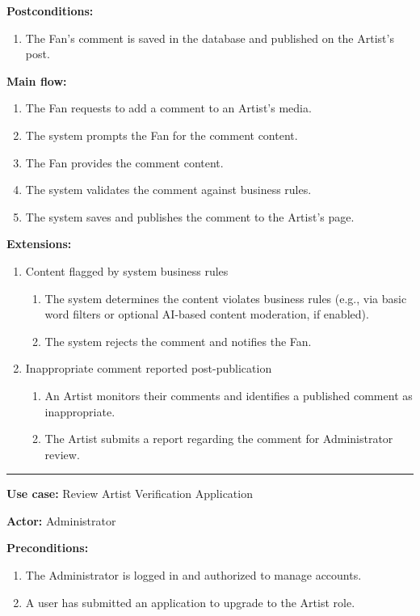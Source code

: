 \documentclass{article}
\begin{document}
{\bfseries Postconditions:}
\begin{enumerate}
	\item The Fan's comment is saved in the database and published on the Artist's post.
\end{enumerate}

{\bfseries Main flow:}
\begin{enumerate}
	\item The Fan requests to add a comment to an Artist's media.
	\item The system prompts the Fan for the comment content.
	\item The Fan provides the comment content.
	\item The system validates the comment against business rules.
	\item The system saves and publishes the comment to the Artist's page.
\end{enumerate}

{\bfseries Extensions:}
\begin{enumerate}
	\item [4a.] Content flagged by system business rules
	\begin{enumerate}
		\item [4a1.] The system determines the content violates business rules (e.g., via basic word filters or optional AI-based content moderation, if enabled).
		\item [4a2.] The system rejects the comment and notifies the Fan.
	\end{enumerate}
	\item [5a.] Inappropriate comment reported post-publication
	\begin{enumerate}
		\item [5a1.] An Artist monitors their comments and identifies a published comment as inappropriate.
		\item [5a2.] The Artist submits a report regarding the comment for Administrator review.
	\end{enumerate}
\end{enumerate}


\hrule
\bigskip

{\bfseries Use case:} Review Artist Verification Application

{\bfseries Actor:} Administrator

{\bfseries Preconditions:}
\begin{enumerate}
	\item The Administrator is logged in and authorized to manage accounts.
	\item A user has submitted an application to upgrade to the Artist role.
\end{enumerate}
\end{document}
